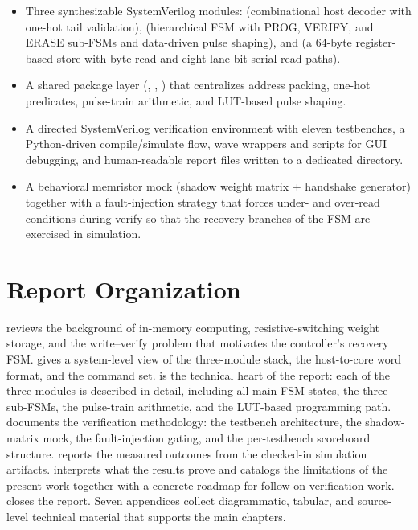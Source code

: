 \begin{itemize}
    \item Three synthesizable SystemVerilog modules: 
          (combinational host decoder with one-hot tail validation),
           (hierarchical FSM with PROG, VERIFY, and
          ERASE sub-FSMs and data-driven pulse shaping), and
           (a 64-byte register-based store with
          byte-read and eight-lane bit-serial read paths).
    \item A shared package layer (,
          , ) that
          centralizes address packing, one-hot predicates, pulse-train
          arithmetic, and LUT-based pulse shaping.
    \item A directed SystemVerilog verification environment with eleven
          testbenches, a Python-driven compile/simulate flow, wave wrappers
          and  scripts for GUI debugging, and human-readable report
          files written to a dedicated  directory.
    \item A behavioral memristor mock (shadow weight matrix + handshake
          generator) together with a fault-injection strategy that forces
          under- and over-read conditions during verify so that the
          recovery branches of the FSM are exercised in simulation.
\end{itemize}

\section{Report Organization}
\label{sec:intro-organization}

 reviews the background of in-memory computing,
resistive-switching weight storage, and the write--verify problem that
motivates the controller's recovery FSM.  gives a
system-level view of the three-module stack, the host-to-core word format,
and the command set.  is the technical heart of the report:
each of the three modules is described in detail, including all main-FSM
states, the three sub-FSMs, the pulse-train arithmetic, and the LUT-based
programming path.  documents the verification
methodology: the testbench architecture, the shadow-matrix mock, the
fault-injection gating, and the per-testbench scoreboard structure.
 reports the measured outcomes from the checked-in
simulation artifacts.  interprets what the results prove
and  catalogs the limitations of the present work
together with a concrete roadmap for follow-on verification work.
 closes the report. Seven appendices collect
diagrammatic, tabular, and source-level technical material that supports
the main chapters.
